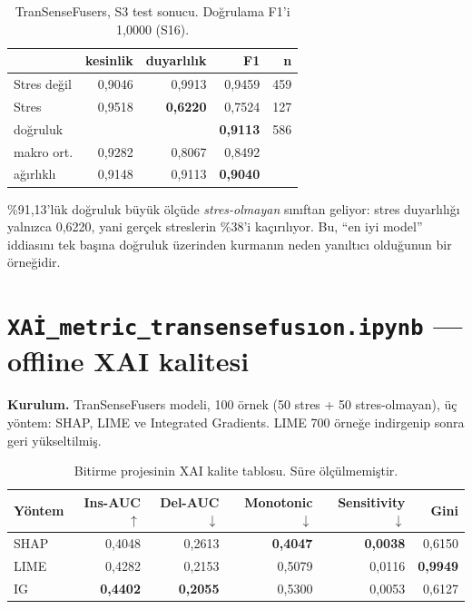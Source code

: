 \documentclass[11pt,a4paper]{report}
\newcommand{\dosya}[1]{\texttt{\footnotesize #1}}
\begin{document}
\begin{table}[H]
\centering\small
\begin{tabular}{@{}lrrrr@{}}
\toprule
& \textbf{kesinlik} & \textbf{duyarlılık} & \textbf{F1} & \textbf{n} \\
\midrule
Stres değil & 0{,}9046 & 0{,}9913 & 0{,}9459 & 459 \\
Stres       & 0{,}9518 & \textbf{0{,}6220} & 0{,}7524 & 127 \\
\midrule
doğruluk    & \multicolumn{3}{r}{\textbf{0{,}9113}} & 586 \\
makro ort.  & 0{,}9282 & 0{,}8067 & 0{,}8492 & \\
ağırlıklı   & 0{,}9148 & 0{,}9113 & \textbf{0{,}9040} & \\
\bottomrule
\end{tabular}
\caption{TranSenseFusers, S3 test sonucu. Doğrulama F1'i 1{,}0000 (S16).}
\end{table}

\begin{uyari}
\%91{,}13'lük doğruluk büyük ölçüde \emph{stres-olmayan} sınıftan geliyor:
stres duyarlılığı yalnızca 0{,}6220, yani gerçek streslerin \%38'i kaçırılıyor.
Bu, ``en iyi model'' iddiasını tek başına doğruluk üzerinden kurmanın neden
yanıltıcı olduğunun bir örneğidir.
\end{uyari}

\section{\dosya{XAİ\_metric\_transensefusıon.ipynb} --- offline XAI kalitesi}

\textbf{Kurulum.} TranSenseFusers modeli, 100 örnek (50 stres + 50
stres-olmayan), üç yöntem: SHAP, LIME ve Integrated Gradients.
LIME 700 örneğe indirgenip sonra geri yükseltilmiş.

\begin{table}[H]
\centering\small
\begin{tabular}{@{}lrrrrr@{}}
\toprule
\textbf{Yöntem} & \textbf{Ins-AUC} $\uparrow$ & \textbf{Del-AUC} $\downarrow$ & \textbf{Monotonic} $\downarrow$ & \textbf{Sensitivity} $\downarrow$ & \textbf{Gini} \\
\midrule
SHAP & 0{,}4048 & 0{,}2613 & \textbf{0{,}4047} & \textbf{0{,}0038} & 0{,}6150 \\
LIME & 0{,}4282 & 0{,}2153 & 0{,}5079 & 0{,}0116 & \textbf{0{,}9949} \\
IG   & \textbf{0{,}4402} & \textbf{0{,}2055} & 0{,}5300 & 0{,}0053 & 0{,}6127 \\
\bottomrule
\end{tabular}
\caption{Bitirme projesinin XAI kalite tablosu. Süre ölçülmemiştir.}
\end{table}
\end{document}

